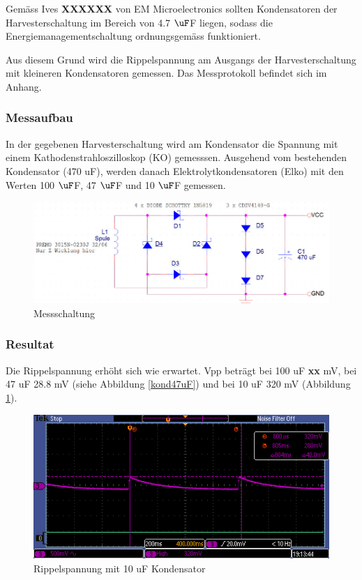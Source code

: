 Gemäss Ives \textbf{XXXXXX} von EM Microelectronics sollten Kondensatoren der Harvesterschaltung im Bereich von 4.7 $\uF $F liegen, sodass die Energiemanagementschaltung ordnungsgemäss funktioniert.  

Aus diesem Grund wird die Rippelspannung am Ausgangs der Harvesterschaltung mit kleineren Kondensatoren gemessen. Das Messprotokoll befindet sich im Anhang.

\subsubsection*{Messaufbau}
In der gegebenen Harvesterschaltung wird am Kondensator die Spannung mit einem Kathodenstrahloszilloskop (KO) gemesssen. Ausgehend vom bestehenden Kondensator (470 uF), werden danach Elektrolytkondensatoren (Elko) mit den Werten 100 $\uF $F, 47 $\uF $F und 10 $\uF $F gemessen.

\begin{figure}
    \includegraphics[bb = 0 0 100 100]{3Vorgehen/imag/messschaltungHarvesterschaltung.jpg}
    \caption{Messschaltung}
\end{figure}

\subsubsection*{Resultat}

Die Rippelspannung erhöht sich wie erwartet. Vpp beträgt bei 100 uF \textbf{xx} mV, bei 47 uF 28.8 mV (siehe Abbildung \ref{kond47uF}) und bei 10 uF 320 mV (Abbildung \ref{kond10uF}).
 
\begin{figure}
    \includegraphics[bb = 0 0 100 100]{3Vorgehen/imag/10uF.PNG}
    \caption{Rippelspannung mit 10 uF Kondensator}\label{kond10uF} 
\end{figure}

